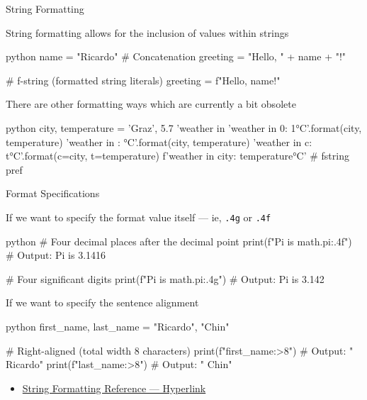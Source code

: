 \documentclass[
	11pt, 
]{beamer}
\begin{document}
\begin{frame}[fragile]{String Formatting}

String formatting allows for the inclusion of values within strings

\begin{mintedbox}{python}
name = "Ricardo"     
# Concatenation
greeting = "Hello, " + name + "!"

# f-string (formatted string literals)
greeting = f"Hello, {name}!"
\end{mintedbox}

There are other formatting ways which are currently a bit obsolete

\begin{mintedbox}{python}
city, temperature = 'Graz', 5.7    
'weather in %
'weather in {0}: {1}°C'.format(city, temperature)
'weather in {}: {}°C'.format(city, temperature)
'weather in {c}: {t}°C'.format(c=city, t=temperature)
f'weather in {city}: {temperature}°C' # fstring pref
\end{mintedbox}

\end{frame}


\begin{frame}[fragile]{Format Specifications}

If we want to specify the format value itself --- ie, \texttt{.4g} or \texttt{.4f}

\begin{mintedbox}{python}
# Four decimal places after the decimal point
print(f"Pi is {math.pi:.4f}") # Output: Pi is 3.1416

# Four significant digits
print(f"Pi is {math.pi:.4g}") # Output: Pi is 3.142
\end{mintedbox}

If we want to specify the sentence alignment

\begin{mintedbox}{python}
first_name, last_name = "Ricardo", "Chin"

# Right-aligned (total width 8 characters)
print(f"{first_name:>8}")  # Output: " Ricardo"
print(f"{last_name:>8}")   # Output: "    Chin"
\end{mintedbox}

\begin{itemize}
    \item \href{https://mkaz.blog/working-with-python/string-formatting/}{String Formatting Reference --- Hyperlink}
\end{itemize}

\end{frame}
\end{document}
